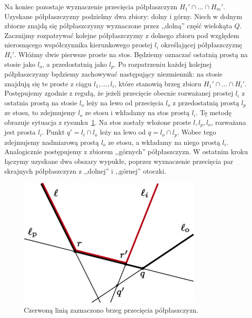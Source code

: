 Na koniec pozostaje wyznaczenie przecięcia półpłaszczyzn $H_1' \cap
\ldots \cap H_m'$. Uzyskane półpłaszczyzny podzielmy dwa zbiory: dolny
i górny. Niech w dolnym zbiorze znajdą się półpłaszczyzny wyznaczone
przez ,,dolną'' część wielokąta $Q$. Zacznijmy rozpatrywać kolejne
półpłaszczyzny z dolnego zbioru pod względem nierosnącego
współczynnika kierunkowego prostej $l_i$ określającej półpłaszczyznę
$H_i'$. Włóżmy dwie pierwsze proste na stos. Będziemy oznaczać
ostatnią prostą na stosie jako $l_o$, a przedostatnią jako $l_p$. Po
rozpatrzeniu każdej kolejnej półpłaszczyzny będziemy zachowywać
następujący niezmiennik: na stosie znajdują się te proste z ciągu
$l_1, \ldots, l_i$, które stanowią brzeg zbioru $H_1' \cap \ldots \cap
H_i'$. Postępujemy zgodnie z regułą, że jeżeli przecięcie obecnie
rozważanej prostej $l_i$ z ostatnia prostą na stosie $l_o$ leży na
lewo od przecięcia $l_o$ z przedostatnią prostą $l_p$ ze stosu, to
zdejmujemy $l_o$ ze stosu i wkładamy na stos prostą $l_i$. Tę metodę
obrazuje sytuacja z rysunku~\ref{img:containment2}. Na stos zostały
włożone proste $l, l_p, l_o$, rozważana jest prosta $l_i$. Punkt $q' =
l_i \cap l_o$ leży na lewo od $q = l_o \cap l_p$. Wobec tego
zdejmujemy nadmiarową prostą $l_o$ ze stosu, a wkładamy na niego
prostą $l_i$. Analogicznie postępujemy z zbiorem ,,górnych''
półpłaszczyzn. W ostatnim kroku łączymy uzyskane dwa obszary wypukłe,
poprzez wyznaczenie przecięcia par skrajnych półpłaszczyzn z
,,dolnej'' i ,,górnej'' otoczki.

\vspace{3cm}

\begin{figure}[ht]
  \centering
  \includegraphics[scale=0.6]{img/containment2}
  \caption{\label{img:containment2} Czerwoną linią zaznaczono brzeg
    przecięcia półpłaszczyzn.}
\end{figure}

\cleardoublepage{}

